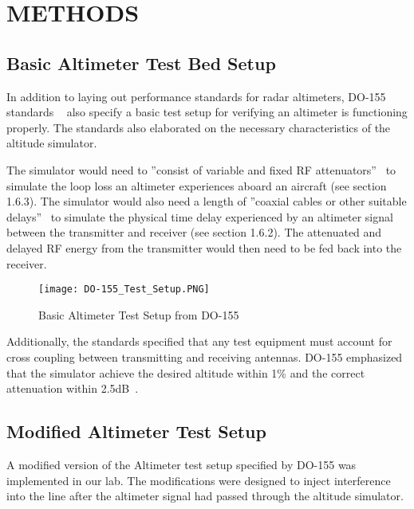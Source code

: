 %
%
%
%



\chapter{METHODS}
\section{Basic Altimeter Test Bed Setup}
In addition to laying out performance standards for radar altimeters, DO-155 standards ~\cite{noauthor_minimum_1974} also specify a basic test setup for verifying an altimeter is functioning properly. The standards also elaborated on the necessary characteristics of the altitude simulator. 

The simulator would need to ''consist of variable and fixed RF attenuators''~\cite{noauthor_minimum_1974}  to simulate the loop loss an altimeter experiences aboard an aircraft (see section 1.6.3). The simulator would also need a length of ''coaxial cables or other suitable delays''~\cite{noauthor_minimum_1974}  to simulate the physical time delay experienced by an altimeter signal between the transmitter and receiver (see section 1.6.2). The attenuated and delayed RF energy from the transmitter would then need to be fed back into the receiver. 
\begin{figure}[ht]
\centering
\texttt{[image: DO-155\_Test\_Setup.PNG]}
\caption[]{Basic Altimeter Test Setup from DO-155~\cite{noauthor_minimum_1974}}

\label{fig:Basic Testbed}

\end{figure}
Additionally, the standards specified that any test equipment must account for cross coupling between transmitting and receiving antennas. DO-155 emphasized that the simulator achieve the desired altitude within 1\% and the correct attenuation within 2.5dB~\cite{noauthor_minimum_1974}.

\section{Modified Altimeter Test Setup} 
A modified version of the Altimeter test setup specified by DO-155 was implemented in our lab. The modifications were designed to inject interference into the line after the altimeter signal had passed through the altitude simulator. 
